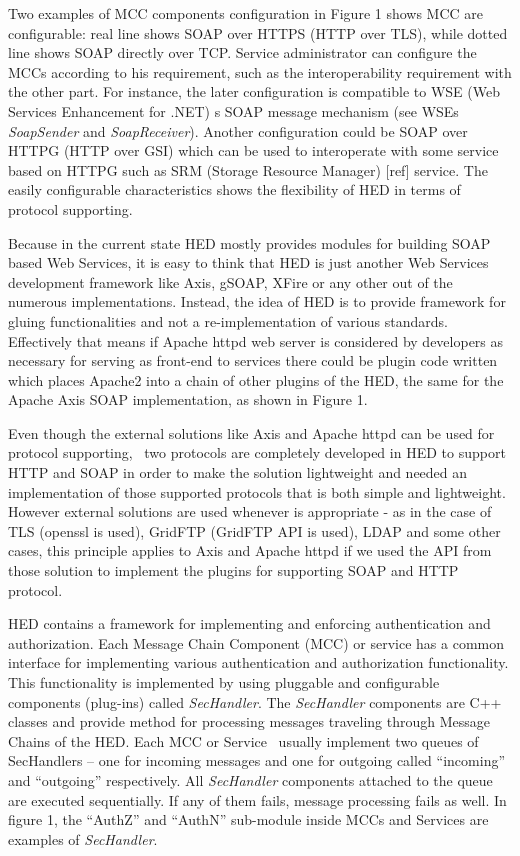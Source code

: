 \documentclass{article}
\begin{document}
Two examples of MCC components configuration in Figure 1 shows MCC are
configurable: real line shows SOAP over HTTPS (HTTP over TLS), while
dotted line shows SOAP directly over TCP. Service administrator can
configure the MCCs according to his requirement, such as the
interoperability requirement with the other part. For instance, the
later configuration is compatible to WSE (Web Services Enhancement for
.NET) {\textquotesingle}s SOAP message mechanism (see
WSE{\textquotesingle}s \textit{SoapSender} and \textit{SoapReceiver}).
Another configuration could be SOAP over HTTPG (HTTP over GSI) which
can be used to interoperate with some service based on HTTPG such as
SRM (Storage Resource Manager) [ref] service. The easily configurable
characteristics shows the flexibility of HED in terms of protocol
supporting.

Because in the current state HED mostly provides modules for building
SOAP based Web Services, it is easy to think that HED is just another
Web Services development framework like Axis, gSOAP, XFire or any other
out of the numerous implementations. Instead, the idea of HED is to
provide framework for gluing functionalities and not a
re-implementation of various standards. Effectively that means if
Apache httpd web server is considered by developers as necessary for
serving as front-end to services there could be plugin code written
which places Apache2 into a chain of other plugins of the HED, the same
for the Apache Axis SOAP implementation, as shown in Figure 1.

Even though the external solutions like Axis and Apache httpd can be
used for protocol supporting, \ two protocols are completely developed
in HED to support HTTP and SOAP in order to make the solution
lightweight and needed an implementation of those supported protocols
that is both simple and lightweight. However external solutions are
used whenever is appropriate - as in the case of TLS (openssl is used),
GridFTP (GridFTP API is used), LDAP and some other cases, this
principle applies to Axis and Apache httpd if we used the API from
those solution to implement the plugins for supporting SOAP and HTTP
protocol. 

HED contains a framework for implementing and enforcing authentication
and authorization. Each Message Chain Component (MCC) or service has a
common interface for implementing various authentication and
authorization functionality. This functionality is implemented by using
pluggable and configurable components (plug-ins) called
\textit{SecHandler}. The \textit{SecHandler} components are C++ classes
and provide method for processing messages traveling through Message
Chains of the HED. Each MCC or Service \ usually implement two queues
of SecHandlers -- one for incoming messages and one for outgoing called
{\textquotedblleft}incoming{\textquotedblright} and
{\textquotedblleft}outgoing{\textquotedblright} respectively. All
\textit{SecHandler} components attached to the queue are executed
sequentially. If any of them fails, message processing fails as well.
In figure 1, the {\textquotedblleft}AuthZ{\textquotedblright} and
{\textquotedblleft}AuthN{\textquotedblright} sub-module inside MCCs and
Services are examples of \textit{SecHandler}.
\end{document}
